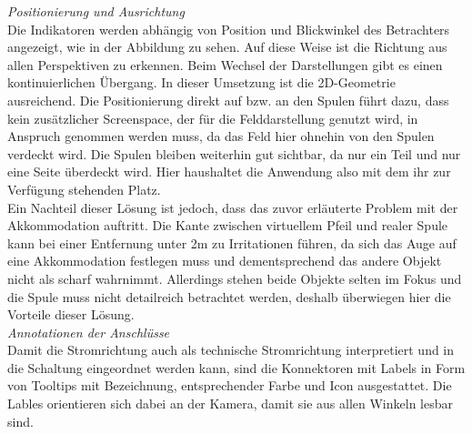 \textit{Positionierung und Ausrichtung}\\
Die Indikatoren werden abhängig von Position und Blickwinkel des Betrachters angezeigt, wie in der Abbildung zu sehen. Auf diese Weise ist die Richtung aus allen Perspektiven zu erkennen. Beim Wechsel der Darstellungen gibt es einen kontinuierlichen Übergang. In dieser Umsetzung ist die 2D-Geometrie ausreichend. Die Positionierung direkt auf bzw. an den Spulen führt dazu, dass kein zusätzlicher Screenspace, der für die Felddarstellung genutzt wird, in Anspruch genommen werden muss, da das Feld hier ohnehin von den Spulen verdeckt wird. Die Spulen bleiben weiterhin gut sichtbar, da nur ein Teil und nur eine Seite überdeckt wird. Hier haushaltet die Anwendung also mit dem ihr zur Verfügung stehenden Platz.\\

Ein Nachteil dieser Lösung ist jedoch, dass das zuvor erläuterte Problem mit der Akkommodation auftritt. Die Kante zwischen virtuellem Pfeil und realer Spule kann bei einer Entfernung unter 2m zu Irritationen führen, da sich das Auge auf eine Akkommodation festlegen muss und dementsprechend das andere Objekt nicht als scharf wahrnimmt. Allerdings stehen beide Objekte selten im Fokus und die Spule muss nicht detailreich betrachtet werden, deshalb überwiegen hier die Vorteile dieser Lösung.\\

\textit{Annotationen der Anschlüsse}\\
Damit die Stromrichtung auch als technische Stromrichtung interpretiert und in die Schaltung eingeordnet werden kann, sind die Konnektoren mit Labels in Form von Tooltips mit Bezeichnung, entsprechender Farbe und Icon ausgestattet. Die Lables orientieren sich dabei an der Kamera, damit sie aus allen Winkeln lesbar sind.\\

\vspace{8px}
\begin{center}
	\\
\end{center}
\vspace{6px}

